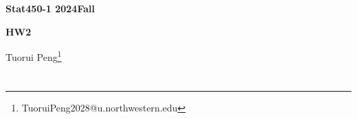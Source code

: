 \documentclass[11pt,a4paper]{ctexart}
\numberwithin{equation}{section}%
\begin{document}
\begin{center}\thispagestyle{plain}

{\LARGE\textbf{Stat450-1 2024Fall}}

{\Large\textbf{HW2}}

Tuorui Peng\footnote{TuoruiPeng2028@u.northwestern.edu}
\end{center}

\thispagestyle{myheadings}
\pagestyle{myheadings}






\section{}

\subsection{}
\end{document}
